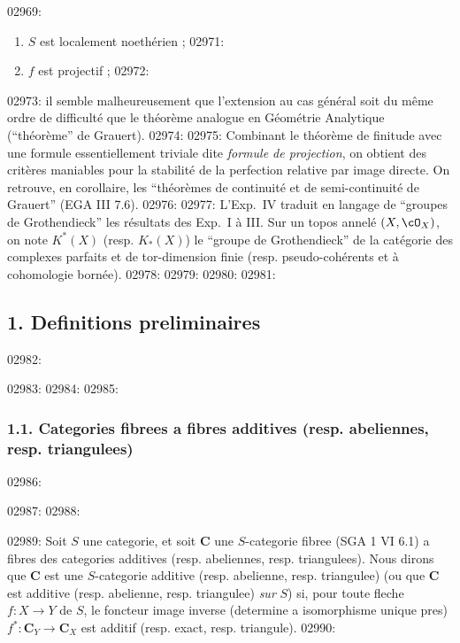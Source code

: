 02969: \begin{enumerate}
02970: \item[a)] $S$ est localement noeth\'erien ;
02971: \item[b)] $f$ est projectif ;
02972: \end{enumerate}
02973: il semble malheureusement que l'extension au cas g\'en\'eral soit du m\^eme ordre de difficult\'e que le th\'eor\`eme analogue en G\'eom\'etrie Analytique (``th\'eor\`eme'' de Grauert).
02974: 
02975: Combinant le th\'eor\`eme de finitude avec une formule essentiellement triviale dite \emph{formule de projection}, on obtient des crit\`eres maniables pour la stabilit\'e de la perfection relative par image directe. On retrouve, en corollaire, les ``th\'eor\`emes de continuit\'e et de semi-continuit\'e de Grauert'' (EGA III 7.6).
02976: 
02977: L'Exp.~IV traduit en langage de ``groupes de Grothendieck'' les r\'esultats des Exp.~I \`a III. Sur un topos annel\'e $(X, \cO_X)$, on note $K^*(X)$ (resp. $K_*(X)$) le ``groupe de Grothendieck'' de la cat\'egorie des complexes parfaits et de tor-dimension finie (resp. pseudo-coh\'erents et \`a cohomologie born\'ee).
02978: 
02979: 
02980: %
02981: \subsection*{1. Definitions preliminaires}
02982: 
02983: %
02984: 
02985: \subsubsection*{1.1. Categories fibrees a fibres additives (resp. abeliennes, resp. triangulees)}
02986: 
02987: 
02988: \begin{definition}
02989: Soit $S$ une categorie, et soit $\mathbf{C}$ une $S$-categorie fibree (SGA 1 VI 6.1) a fibres des categories additives (resp. abeliennes, resp. triangulees). Nous dirons que $\mathbf{C}$ est une $S$-categorie additive (resp. abelienne, resp. triangulee) (ou que $\mathbf{C}$ est additive (resp. abelienne, resp. triangulee) \emph{sur} $S$) si, pour toute fleche $f : X \to Y$ de $S$, le foncteur image inverse (determine a isomorphisme unique pres) $f^* : \mathbf{C}_Y \to \mathbf{C}_X$ est additif (resp. exact, resp. triangule).
02990: \end{definition}
